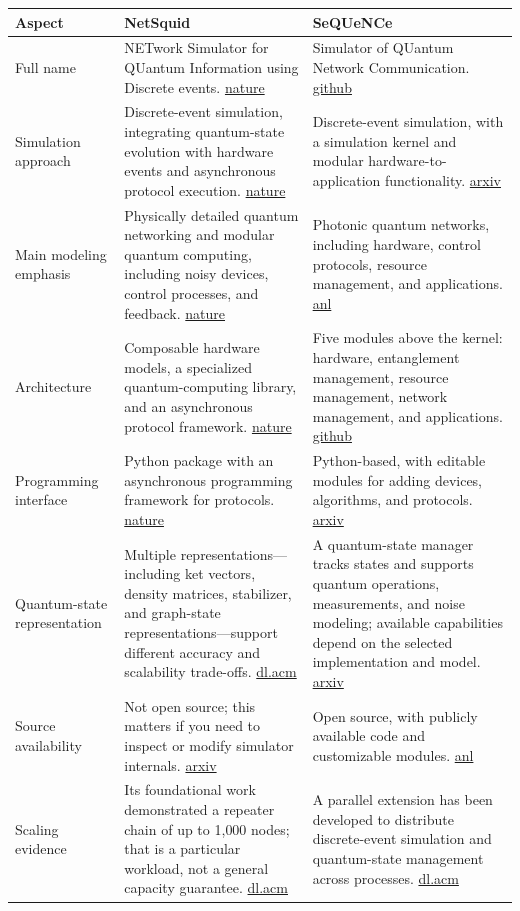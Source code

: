 \documentclass[11pt]{article}
\newcommand{\nature}{\href{https://www.nature.com/articles/s42005-021-00647-8}{nature}}
\newcommand{\github}{\href{https://github.com/sequence-toolbox/SeQUeNCe}{github}}
\newcommand{\arxivseq}{\href{https://arxiv.org/html/2009.12000}{arxiv}}
\newcommand{\anl}{\href{https://www.anl.gov/sequence-simulator-of-quantum-network-communication}{anl}}
\newcommand{\dlacm}{\href{https://dl.acm.org/doi/10.1145/3634701}{dl.acm}}
\newcommand{\arxivclosed}{\href{https://arxiv.org/html/2412.08956v1}{arxiv}}
\newcommand{\arxivqsm}{\href{https://arxiv.org/html/2610.09322v1}{arxiv}}
\begin{document}
{\small
\renewcommand{\tabularxcolumn}[1]{>{\raggedright\arraybackslash}p{#1}}
\begin{tabularx}{\textwidth}{@{}>{\raggedright\arraybackslash}p{}XX@{}}
\toprule
\textbf{Aspect} & \textbf{NetSquid} & \textbf{SeQUeNCe} \\
\midrule
Full name
  & NETwork Simulator for QUantum Information using Discrete events. \nature
  & Simulator of QUantum Network Communication. \github \\
\addlinespace
Simulation approach
  & Discrete-event simulation, integrating quantum-state evolution with hardware events and asynchronous protocol execution. \nature
  & Discrete-event simulation, with a simulation kernel and modular hardware-to-application functionality. \arxivseq \\
\addlinespace
Main modeling emphasis
  & Physically detailed quantum networking and modular quantum computing, including noisy devices, control processes, and feedback. \nature
  & Photonic quantum networks, including hardware, control protocols, resource management, and applications. \anl \\
\addlinespace
Architecture
  & Composable hardware models, a specialized quantum-computing library, and an asynchronous protocol framework. \nature
  & Five modules above the kernel: hardware, entanglement management, resource management, network management, and applications. \github \\
\addlinespace
Programming interface
  & Python package with an asynchronous programming framework for protocols. \nature
  & Python-based, with editable modules for adding devices, algorithms, and protocols. \arxivseq \\
\addlinespace
Quantum-state representation
  & Multiple representations---including ket vectors, density matrices, stabilizer, and graph-state representations---support different accuracy and scalability trade-offs. \dlacm
  & A quantum-state manager tracks states and supports quantum operations, measurements, and noise modeling; available capabilities depend on the selected implementation and model. \arxivqsm \\
\addlinespace
Source availability
  & Not open source; this matters if you need to inspect or modify simulator internals. \arxivclosed
  & Open source, with publicly available code and customizable modules. \anl \\
\addlinespace
Scaling evidence
  & Its foundational work demonstrated a repeater chain of up to 1{,}000 nodes; that is a particular workload, not a general capacity guarantee. \dlacm
  & A parallel extension has been developed to distribute discrete-event simulation and quantum-state management across processes. \dlacm \\
\bottomrule
\end{tabularx}
}
\end{document}
